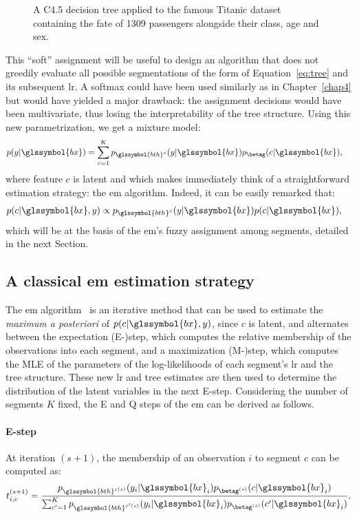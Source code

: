 \begin{figure}
\resizebox{\textwidth}{!}{}
\caption{A C4.5 decision tree applied to the famous Titanic dataset containing the fate of 1309 passengers alongside their class, age and sex.}
\label{fig:titanic_tree}
\end{figure}

This ``soft'' assignment will be useful to design an algorithm that does not greedily evaluate all possible segmentations of the form of Equation~\eqref{eq:tree} and its subsequent \gls{lr}. A softmax could have been used similarly as in Chapter~\ref{chap4} but would have yielded a major drawback: the assignment decisions would have been multivariate, thus losing the interpretability of the tree structure. Using this new parametrization, we get a mixture model:
\begin{align*}
p(y | \glssymbol{bx}) & = \sum_{c = 1}^K p_{\glssymbol{bth}^c}(y | \glssymbol{bx}) p_{\betag}(c | \glssymbol{bx}),
\end{align*}
where feature $c$ is latent and which makes immediately think of a straightforward estimation strategy: the \gls{em} algorithm. Indeed, it can be easily remarked that:
\begin{align*}
p(c | \glssymbol{bx}, y) & \propto p_{\glssymbol{bth}^c}(y | \glssymbol{bx}) p(c | \glssymbol{bx}),
\end{align*}
which will be at the basis of the \gls{em}'s fuzzy assignment among segments, detailed in the next Section.

\subsection{A classical \gls{em} estimation strategy}

The \gls{em} algorithm~\cite{dempster1977maximum} is an iterative method that can be used to estimate the \textit{maximum a posteriori} of $p(c | \glssymbol{bx}, y)$, since $c$ is latent, and alternates between the expectation (E-)step, which computes the relative membership of the observations into each segment, and a maximization (M-)step, which computes the MLE of the parameters of the log-likelihoods of each segment's \gls{lr} and the tree structure. These new \gls{lr} and tree estimates are then used to determine the distribution of the latent variables in the next E-step. Considering the number of segments $K$ fixed, the E and Q steps of the \gls{em} can be derived as follows.

\paragraph{E-step}
At iteration $(s+1)$, the membership of an observation $i$ to segment $c$ can be computed as:
\[ t_{i,c}^{(s+1)} = \frac{p_{\glssymbol{bth}^{c(s)}}(y_i | \glssymbol{bx}_i) p_{\betag^{(s)}}(c | \glssymbol{bx}_i) }{ \sum_{c'=1}^K p_{\glssymbol{bth}^{c{'}{(s)}}}(y_i | \glssymbol{bx}_i) p_{\betag^{(s)}}(c{'} | \glssymbol{bx}_i) }.\]

